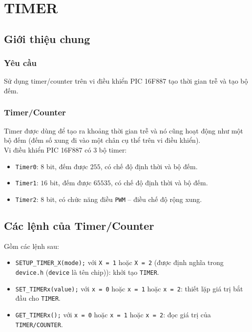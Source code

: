 \chapter{TIMER}
\section{Giới thiệu chung}
\subsection{Yêu cầu}
Sử dụng timer/counter trên vi điều khiển PIC 16F887 tạo thời gian trễ và tạo bộ đếm.
\subsection{Timer/Counter}
Timer được dùng để tạo ra khoảng thời gian trễ và nó cũng hoạt động như một bộ đếm (đếm số xung đi vào một chân cụ thể trên vi điều khiển).\\

Vi điều khiển PIC 16F887 có 3 bộ timer:
\begin{itemize}
\item \verb|Timer0|: $8$ bit, đếm được $255$, có chế độ định thời và bộ đếm.
\item \verb|Timer1|: $16$ bit, đếm được $65535$, có chế độ định thời và bộ đếm.
\item \verb|Timer2|: $8$ bit, có chức năng điều \verb|PWM| -- điều chế độ rộng xung.
\end{itemize}
\section{Các lệnh của Timer/Counter}
Gồm các lệnh sau:
\begin{itemize}
\item \verb|SETUP_TIMER_X(mode);| với \verb|X = 1| hoặc \verb|X = 2| (được định nghĩa trong \verb|device.h| (\verb|device| là tên chip)): khởi tạo \verb|TIMER|.
\item \verb|SET_TIMERx(value);| với \verb|x = 0| hoặc \verb|x = 1| hoặc \verb|x = 2|: thiết lặp giá trị bắt đầu cho \verb|TIMER|.
\item \verb|GET_TIMERx();| với \verb|x = 0| hoặc \verb|x = 1| hoặc \verb|x = 2|: đọc giá trị của \verb|TIMER/COUNTER|.
\end{itemize}


